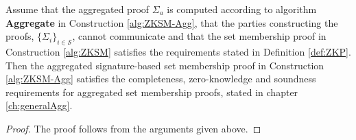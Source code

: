 \vspace{10pt}
\begin{thm}
Assume that the aggregated proof $\Sigma_a$ is computed according to algorithm \textbf{Aggregate} in Construction \ref{alg:ZKSM-Agg},  that the parties constructing the proofs, $\{\Sigma_i\}_{i\in\mathcal{S}}$, cannot communicate and that the set membership proof in Construction \ref{alg:ZKSM} satisfies the requirements stated  in Definition \ref{def:ZKP}.
Then the  aggregated signature-based set membership proof in Construction \ref{alg:ZKSM-Agg} satisfies the completeness, zero-knowledge and soundness requirements for aggregated set membership proofs, stated in chapter \ref{ch:generalAgg}.
\end{thm}
\begin{proof}
The proof follows from the arguments given above. 
\end{proof}











